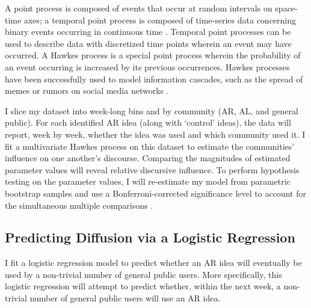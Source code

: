 \documentclass[acmlarge, screen, authorversion]{acmart}
\begin{document}
A point process is composed of events that occur at random intervals on space-time axes; a temporal point process is composed of time-series data concerning binary events occurring in continuous time \cite{daleyIntroductionTheoryPoint2003, ogataSpaceTimePointProcessModels1998}. Temporal point processes can be used to describe data with discretized time points wherein an event may have occurred. A Hawkes process is a special point process wherein the probability of an event occurring is increased by its previous occurrences. Hawkes processes have been successfully used to model information cascades, such as the spread of memes or rumors on social media networks \cite{luoMultiTaskMultiDimensionalHawkes2015,lukasikHawkesProcessesContinuous2016}.

I slice my dataset into week-long bins and by community (AR, AL, and general public). For each identified AR idea (along with  `control' ideas), the data will report, week by week, whether the idea was used and which community used it. I fit a multivariate Hawkes process on this dataset to estimate the communities' influence on one another's discourse. Comparing the magnitudes of estimated parameter values will reveal relative discursive influence. To perform hypothesis testing on the parameter values, I will re-estimate my model from parametric bootstrap samples \cite{reinhartReviewSelfExcitingSpatioTemporal2018} and use a Bonferroni-corrected significance level to account for the simultaneous multiple comparisons \cite{tanEffectWordingMessage2014}.




\subsection{Predicting Diffusion via a Logistic Regression}

I fit a logistic regression model to predict whether an AR idea will eventually be used by a non-trivial number of general public users. More specifically, this logistic regression will attempt to predict whether, within the next week, a non-trivial number of general public users will use an AR idea. 
\end{document}

